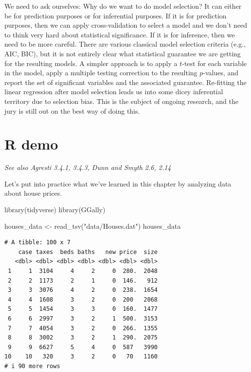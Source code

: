 \documentclass[
  11pt,
  letterpaper,
  oneside]{book}
\newenvironment{Shaded}{\begin{snugshade}}{\end{snugshade}}
\newcommand{\FunctionTok}[1]{\textcolor[rgb]{0.28,0.35,0.67}{#1}}
\newcommand{\NormalTok}[1]{\textcolor[rgb]{0.00,0.23,0.31}{#1}}
\newcommand{\OtherTok}[1]{\textcolor[rgb]{0.00,0.23,0.31}{#1}}
\newcommand{\StringTok}[1]{\textcolor[rgb]{0.13,0.47,0.30}{#1}}
\theoremstyle{plain}
\theoremstyle{plain}
\theoremstyle{definition}
\theoremstyle{definition}
\theoremstyle{plain}
\theoremstyle{remark}
\begin{document}
We need to ask ourselves: Why do we want to do model selection? It can
either be for prediction purposes or for inferential purposes. If it is
for prediction purposes, then we can apply cross-validation to select a
model and we don't need to think very hard about statistical
significance. If it is for inference, then we need to be more careful.
There are various classical model selection criteria (e.g., AIC, BIC),
but it is not entirely clear what statistical guarantee we are getting
for the resulting models. A simpler approach is to apply a \(t\)-test
for each variable in the model, apply a multiple testing correction to
the resulting \(p\)-values, and report the set of significant variables
and the associated guarantee. Re-fitting the linear regression after
model selection leads us into some dicey inferential territory due to
selection bias. This is the subject of ongoing research, and the jury is
still out on the best way of doing this.

\hypertarget{sec-r-demo-part-2}{%
\chapter{R demo}\label{sec-r-demo-part-2}}

\emph{See also Agresti 3.4.1, 3.4.3, Dunn and Smyth 2.6, 2.14}

Let's put into practice what we've learned in this chapter by analyzing
data about house prices.

\begin{Shaded}
\begin{Highlighting}[]
\FunctionTok{library}\NormalTok{(tidyverse)}
\FunctionTok{library}\NormalTok{(GGally)}

\NormalTok{houses\_data }\OtherTok{\textless{}{-}} \FunctionTok{read\_tsv}\NormalTok{(}\StringTok{"data/Houses.dat"}\NormalTok{)}
\NormalTok{houses\_data}
\end{Highlighting}
\end{Shaded}

\begin{verbatim}
# A tibble: 100 x 7
    case taxes  beds baths   new price  size
   <dbl> <dbl> <dbl> <dbl> <dbl> <dbl> <dbl>
 1     1  3104     4     2     0  280.  2048
 2     2  1173     2     1     0  146.   912
 3     3  3076     4     2     0  238.  1654
 4     4  1608     3     2     0  200   2068
 5     5  1454     3     3     0  160.  1477
 6     6  2997     3     2     1  500.  3153
 7     7  4054     3     2     0  266.  1355
 8     8  3002     3     2     1  290.  2075
 9     9  6627     5     4     0  587   3990
10    10   320     3     2     0   70   1160
# i 90 more rows
\end{verbatim}
\end{document}
